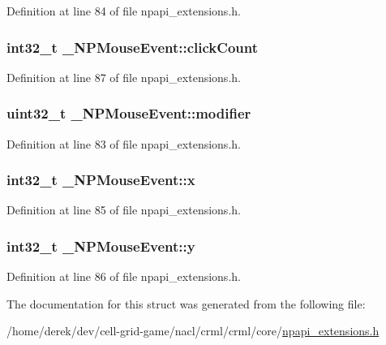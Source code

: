 Definition at line 84 of file npapi\_\-extensions.h.

\hypertarget{struct___n_p_mouse_event_acafa461f9ccac3cf9ca2aee1859359de}{
\subsubsection[{clickCount}]{\setlength{\rightskip}{0pt plus 5cm}int32\_\-t {\bf \_\-NPMouseEvent::clickCount}}}
\label{struct___n_p_mouse_event_acafa461f9ccac3cf9ca2aee1859359de}


Definition at line 87 of file npapi\_\-extensions.h.

\hypertarget{struct___n_p_mouse_event_acd6d4f0ca5929f06c5d14bab34afaf42}{
\subsubsection[{modifier}]{\setlength{\rightskip}{0pt plus 5cm}uint32\_\-t {\bf \_\-NPMouseEvent::modifier}}}
\label{struct___n_p_mouse_event_acd6d4f0ca5929f06c5d14bab34afaf42}


Definition at line 83 of file npapi\_\-extensions.h.

\hypertarget{struct___n_p_mouse_event_a8d3fd458faf6af0179fd231ed40dd8b9}{
\subsubsection[{x}]{\setlength{\rightskip}{0pt plus 5cm}int32\_\-t {\bf \_\-NPMouseEvent::x}}}
\label{struct___n_p_mouse_event_a8d3fd458faf6af0179fd231ed40dd8b9}


Definition at line 85 of file npapi\_\-extensions.h.

\hypertarget{struct___n_p_mouse_event_a2b4778764228e697f81345dccb6ec783}{
\subsubsection[{y}]{\setlength{\rightskip}{0pt plus 5cm}int32\_\-t {\bf \_\-NPMouseEvent::y}}}
\label{struct___n_p_mouse_event_a2b4778764228e697f81345dccb6ec783}


Definition at line 86 of file npapi\_\-extensions.h.



The documentation for this struct was generated from the following file:\begin{DoxyCompactItemize}
\item 
/home/derek/dev/cell-\/grid-\/game/nacl/crml/crml/core/\hyperlink{npapi__extensions_8h}{npapi\_\-extensions.h}\end{DoxyCompactItemize}
